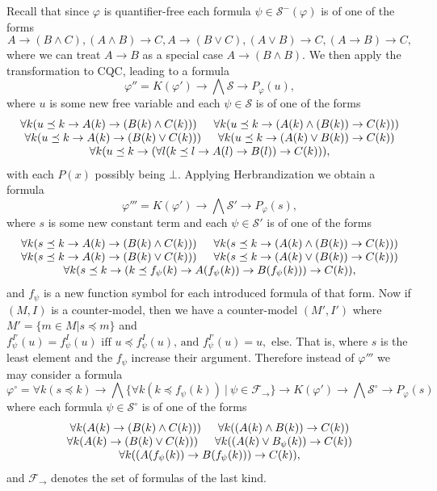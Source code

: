 \documentclass[a4paper,UKenglish,cleveref, autoref, thm-restate]{lipics-v2021}
\begin{document}
Recall that since $\varphi$ is quantifier-free each formula $\psi\in\mathcal S^-(\varphi)$ is of one of the forms
$$A\to (B\wedge C), (A\wedge B)\to C, A\to (B\vee C), (A\vee B)\to C, (A\to B)\to C,$$
where we can treat $A\to B$ as a special case $A\to (B\wedge B)$. We then apply the transformation to CQC, leading to a formula
$$\varphi'' = K(\varphi')\to\bigwedge  \mathcal S\to P_\varphi(u),$$
where $u$ is some new free variable and each $\psi\in\mathcal S$ is of one of the forms
$$\begin{matrix}
	\forall k(u\preceq k\to A(k)\to (B(k)\wedge C(k)))\indent  \forall k(u\preceq k\to (A(k)\wedge (B(k))\to C(k)))\\
	\forall k(u\preceq k\to A(k)\to (B(k)\vee C(k)))\indent \forall k(u\preceq k\to (A(k)\vee B(k))\to C(k))\\
	\forall k(u\preceq k\to (\forall l(k\preceq l \to A(l)\to B(l))\to C(k))),
\end{matrix}$$
with each $P(x)$ possibly being $\bot$. Applying Herbrandization we obtain a formula
$$\varphi''' = K(\varphi')\to \bigwedge \mathcal S'\to P_\varphi(s),$$
where $s$ is some new constant term and each $\psi\in\mathcal S'$ is of one of the forms
$$\begin{matrix}
	\forall k(s\preceq k\to A(k)\to (B(k)\wedge C(k)))\indent \forall k(s\preceq k\to (A(k)\wedge (B(k))\to C(k)))\\
	\forall k(s\preceq k\to A(k)\to (B(k)\vee C(k)))\indent \forall k(s\preceq k\to (A(k)\vee (B(k))\to C(k)))\\
	\forall k(s\preceq k\to (k\preceq f_\psi(k) \to A(f_\psi(k))\to B(f_\psi(k)))\to C(k)),\\
\end{matrix}$$
and $f_\psi$ is a new function symbol for each introduced formula of that form. Now if $(M, I)$ is a counter-model, then we have a counter-model $(M',I')$ where $M' = \{m\in M|s\preceq m\}$ and
$f_\psi^{I'}(u) = f^I_\psi(u) \text{ iff $u\preceq f^{I}_\psi(u)$, and $f_\psi^{I'}(u) = u,$ else.}$ That is, where $s$ is the least element and the $f_\psi$ increase their argument. Therefore instead of $\varphi'''$ we may consider a formula $$\varphi^\circ = \forall k(s\preceq k)\to \bigwedge\{\forall k(k\preceq f_\psi(k))\:|\:\psi\in\mathcal F_\to\}\to K(\varphi')\to \bigwedge \mathcal S^\circ\to P_\varphi(s)$$ where each formula $\psi\in\mathcal S^\circ$ is of one of the forms
$$\begin{matrix}
	\forall k(A(k)\to (B(k)\wedge C(k)))\indent\forall k((A(k)\wedge B(k))\to C(k))\\
	\forall k(A(k)\to (B(k)\vee C(k)))\indent\forall k((A(k)\vee B_\psi(k))\to C(k))\\
	\forall k((A(f_\psi(k))\to B(f_\psi(k)))\to C(k)),
\end{matrix}$$
and $\mathcal F_\to$ denotes the set of formulas of the last kind.
\end{document}

